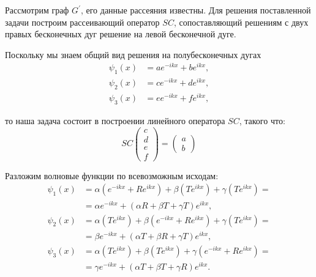 \documentclass[a4 paper, 12 pt]{extarticle}
\begin{document}
   Рассмотрим граф $G^\prime$, его данные рассеяния известны. Для решения поставленной задачи построим рассеивающий оператор $SC$, сопоставляющий решениям с двух правых бесконечных дуг решение на левой бесконечной дуге.
   
   Поскольку мы знаем общий вид решения на полубесконечных дугах
   \begin{equation}
   \begin{split}
   \label{GeneralSolution1}
   \psi_1\left(x\right) &= a e^{-ikx} + b e^{ikx}, \\
   \psi_2\left(x\right) &= c e^{-ikx} + d e^{ikx}, \\
   \psi_3\left(x\right) &= e e^{-ikx} + f e^{ikx},
   \end{split}
   \end{equation}

   то наша задача состоит в построении линейного оператора $SC$, такого что:
   \[SC\left(
   \begin{array}{c}
   c \\
   d \\
   e \\
   f
   \end{array}\right) = \left(\begin{array}{c}
   a \\
   b
   \end{array}\right)\]
   
   Разложим волновые функции по всевозможным исходам:
   \begin{equation}
   \label{GeneralSolution2}
   \begin{aligned}
   \psi_1(x) &= \alpha\left(e^{-ikx} + Re^{ikx}\right) + \beta\left(Te^{ikx}\right) + \gamma \left(Te^{ikx}\right) = \\
   &= \alpha e^{-ikx} + \left(\alpha R + \beta T + \gamma T\right) e^{ikx}, \\
   \psi_2(x) &= \alpha \left(T e^{ikx}\right) + \beta \left(e^{-ikx} + R e^{ikx}\right) + \gamma \left(T e^{ikx}\right) = \\
   &= \beta e^{-ikx} + \left(\alpha T + \beta R + \gamma T\right) e^{ikx}, \\
   \psi_3(x) &= \alpha \left(T e^{ikx}\right) + \beta \left(T e^{ikx}\right) + \gamma \left(e^{-ikx} + R e^{ikx}\right) = \\
   &= \gamma e^{-ikx} + \left(\alpha T + \beta T + \gamma R\right) e^{ikx}.
   \end{aligned}
   \end{equation}
   
\end{document}
